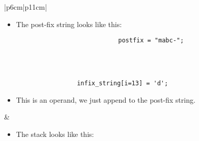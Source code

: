 \begin{center}
\begin{longtable}{ |p{6cm}|p{11cm}| }
\begin{itemize}
                \item The post-fix string looks like this: 
                    {
                        \begin{verbatim}
                            postfix = "mabc-";
                        \end{verbatim}
                    }
            \end{itemize}
            \\
        \hline
        \hline
             \\
        \hline
        \hline
            {
                \begin{verbatim}
                    infix_string[i=13] = 'd';
                \end{verbatim}
            }
            \begin{itemize}
                \item This is an operand, we just append to the post-fix string.
            \end{itemize}
            &
            \begin{itemize}
                \item The stack looks like this: 
                    {
                        \begin{center}

\end{center}}
\end{itemize}
\end{longtable}
\end{center}
